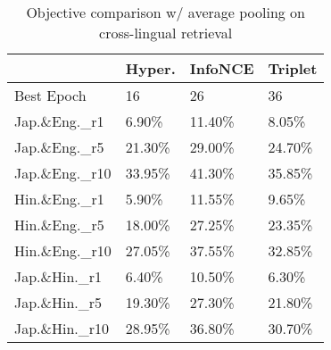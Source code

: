
\begin{table}
    \centering
\begin{tabular}{llll}
\toprule
{} & Hyper. & InfoNCE & Triplet \\
\midrule
Best Epoch          &                   16 &                      26 &                        36 \\
Jap.\&Eng.\_r1  &                6.90\% &                  11.40\% &                     8.05\% \\
Jap.\&Eng.\_r5  &               21.30\% &                  29.00\% &                    24.70\% \\
Jap.\&Eng.\_r10 &               33.95\% &                  41.30\% &                    35.85\% \\
\midrule
Hin.\&Eng.\_r1  &                5.90\% &                  11.55\% &                     9.65\% \\
Hin.\&Eng.\_r5  &                18.00\% &                  27.25\% &                    23.35\% \\
Hin.\&Eng.\_r10 &               27.05\% &                  37.55\% &                    32.85\% \\
\midrule
Jap.\&Hin.\_r1  &                6.40\%  &                  10.50\% &                     6.30\% \\
Jap.\&Hin.\_r5  &               19.30\%  &                  27.30\% &                    21.80\% \\
Jap.\&Hin.\_r10 &               28.95\% &                  36.80\% &                    30.70\% \\
\bottomrule
\end{tabular}

\caption{Objective comparison  w/ average pooling on cross-lingual retrieval}
\label{table:Objective_cling_ret}
\end{table}
